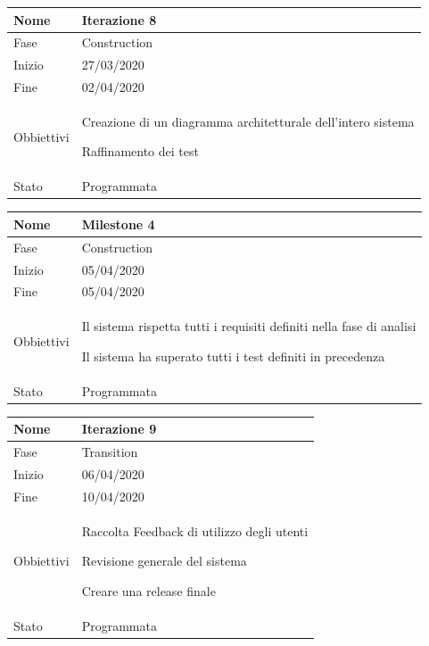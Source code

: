 \begin{center}
\begin{tabular}{ |p{2cm}|p{10cm}|  }
\hline
Nome & Iterazione 8 \\\hline
Fase & Construction \\\hline
Inizio & 27/03/2020 \\\hline
Fine &  02/04/2020  \\\hline
Obbiettivi & 
	\begin{compactitem}
		\item Creazione di un diagramma architetturale dell'intero sistema
		\item Raffinamento dei test
	\end{compactitem}\\\hline
Stato &  Programmata \\\hline
\end{tabular}
\label{table:8}\newline

\begin{tabular}{ |p{2cm}|p{10cm}|  }
\hline
Nome & Milestone 4\\\hline
Fase & Construction \\\hline
Inizio & 05/04/2020 \\\hline
Fine &  05/04/2020 \\\hline
Obbiettivi & 
	\begin{compactitem}
		\item Il sistema rispetta tutti i requisiti definiti nella fase di analisi
		\item Il sistema ha superato tutti i test definiti in precedenza
	\end{compactitem}\\\hline
Stato &  Programmata \\\hline
\end{tabular}
\label{table:milestone4}\newline

\begin{tabular}{ |p{2cm}|p{10cm}|  }
\hline
Nome & Iterazione 9 \\\hline
Fase & Transition \\\hline
Inizio & 06/04/2020 \\\hline
Fine &  10/04/2020  \\\hline
Obbiettivi & 
	\begin{compactitem}
		\item Raccolta Feedback di utilizzo degli utenti
		\item Revisione generale del sistema
		\item Creare una release finale
	\end{compactitem}\\\hline
Stato &  Programmata \\\hline
\end{tabular}
\label{table:9}\newline


\end{center}